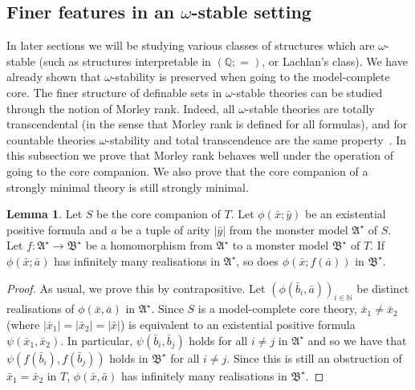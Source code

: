 \documentclass{amsart}
\theoremstyle{definition}
\newtheorem{lemma}[theorem]{Lemma}
\theoremstyle{remark}
\numberwithin{equation}{section}
\newcommand{\fa}{\mathfrak{A}}
\newcommand{\fb}{\mathfrak{B}}
\begin{document}
	

	



\subsection{Finer features in an $\omega$-stable setting}\label{sub:finer}
In later sections we will be studying various classes of structures which are $\omega$-stable (such as structures interpretable in $(\mathbb{Q}; =)$, or Lachlan's class). We have already shown that $\omega$-stability is preserved when going to the model-complete core. The finer structure of definable sets in $\omega$-stable theories can be studied through the notion of Morley rank. Indeed, all $\omega$-stable theories are totally transcendental (in the sense that Morley rank is defined for all formulas), and for countable theories $\omega$-stability and total transcendence are the same property~\cite[Theorem 5.2.6]{Tent-Ziegler}. In this subsection we prove that Morley rank behaves well under the operation of going to the core companion. We also prove that the core companion of a strongly minimal theory is still strongly minimal.

\begin{lemma}\label{lem:algebraicity} Let $S$ be the core companion  of $T$. Let $\phi(\bar{x};\bar{y})$ be an existential positive formula and $a$ be a tuple of arity $|\bar{y}|$ from the monster model $\fa^\star$ of $S$. Let $f \colon \fa^\star\to\fb^\star$ be a homomorphism from $\fa^\star$ to a monster model $\fb^\star$ of $T$. If $\phi(\bar{x};\bar{a})$ has infinitely many realisations in $\fa^\star$, so does $\phi(\bar{x};f(\bar{a}))$ in $\fb^\star$.
\end{lemma}
\begin{proof} As usual, we prove this by contrapositive. Let $(\phi(\bar{b}_i, \bar{a}))_{i\in\mathbb{N}}$ be distinct realisations of $\phi(\bar{x},\bar{a})$ in $\fa^\star$. Since $S$ is a model-complete core theory, $\bar{x}_1\neq \bar{x}_2$ (where $|\bar{x}_1|=|\bar{x}_2|=|\bar{x}|$) is equivalent to an existential positive formula $\psi(\bar{x}_1,\bar{x}_2)$. In particular, $\psi(\bar{b}_i, \bar{b}_j)$ holds for all $i\neq j$ in $\fa^\star$ and so we have that $\psi(f(\bar{b}_i), f(\bar{b}_j))$ holds in $\fb^\star$ for all $i\neq j$. Since this is still an obstruction of $\bar{x}_1=\bar{x}_2$ in $T$, $\phi(\bar{x},\bar{a})$ has infinitely many realisations in $\fb^\star$.
\end{proof}
\end{document}

